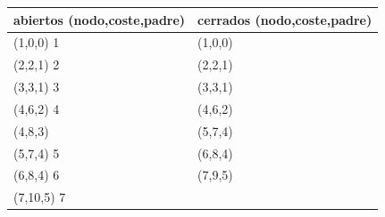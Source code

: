 \documentclass[a4paper, 11pt]{article}
\begin{document}
\begin{table}
	\begin{tabular}[hb!]{ll}
		abiertos (nodo,coste,padre) & cerrados (nodo,coste,padre) \\ \hline
		(1,0,0) 1                & (1,0,0)                     \\
		(2,2,1) 2                  & (2,2,1)                     \\
		(3,3,1) 3                  & (3,3,1)                     \\
		(4,6,2) 4                  & (4,6,2)                     \\
		(4,8,3)                     & (5,7,4)                     \\
		(5,7,4) 5                  &  (6,8,4)                    \\
		(6,8,4) 6                  & (7,9,5)                    \\
		(7,10,5) 7                 & ~                           \\
	\end{tabular}
\end{table}
\end{document}
